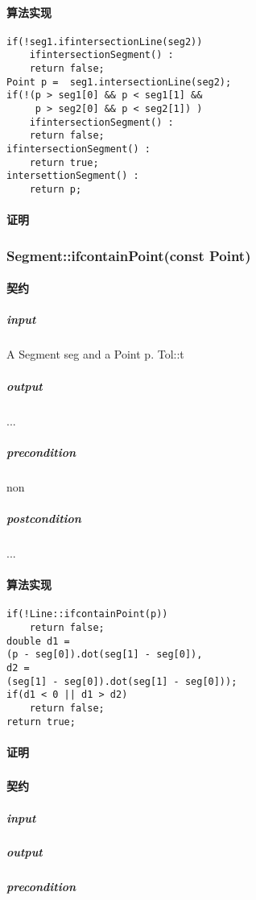 \documentclass[a4paper]{book}
\numberwithin{equation}{chapter}
\theoremstyle{definition}
\begin{document}
\begin{multicols}{2}
\paragraph{算法实现}
\begin{lstlisting}
if(!seg1.ifintersectionLine(seg2))
	ifintersectionSegment() : 
	return false;
Point p =  seg1.intersectionLine(seg2);
if(!(p > seg1[0] && p < seg1[1] &&
     p > seg2[0] && p < seg2[1]) )
   	ifintersectionSegment() :
   	return false;
ifintersectionSegment() :
   	return true;
intersettionSegment() :
	return p;
\end{lstlisting}
\paragraph{证明}

\subsubsection{Segment::ifcontainPoint(const Point)}
\paragraph{契约}
\subparagraph{input}
A Segment seg and a Point p. Tol::t
\subparagraph{output}
...
\subparagraph{precondition}
non
\subparagraph{postcondition}
...
\paragraph{算法实现}
\begin{lstlisting}
if(!Line::ifcontainPoint(p)) 
	return false;
double d1 = 
(p - seg[0]).dot(seg[1] - seg[0]),
d2 = 
(seg[1] - seg[0]).dot(seg[1] - seg[0]));
if(d1 < 0 || d1 > d2)
	return false;
return true;	
\end{lstlisting}
\paragraph{证明}

\subsubsection{}
\paragraph{契约}
\subparagraph{input}

\subparagraph{output}

\subparagraph{precondition}


\end{multicols}
\end{document}
